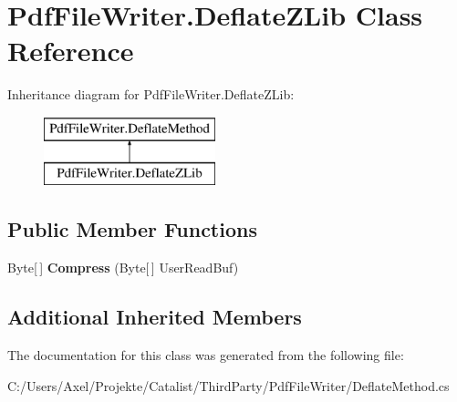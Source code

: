 \hypertarget{class_pdf_file_writer_1_1_deflate_z_lib}{}\section{Pdf\+File\+Writer.\+Deflate\+Z\+Lib Class Reference}
\label{class_pdf_file_writer_1_1_deflate_z_lib}
Inheritance diagram for Pdf\+File\+Writer.\+Deflate\+Z\+Lib\+:\begin{figure}[H]
\begin{center}
\leavevmode
\includegraphics[height=2.000000cm]{class_pdf_file_writer_1_1_deflate_z_lib}
\end{center}
\end{figure}
\subsection*{Public Member Functions}
\begin{DoxyCompactItemize}
\item 
Byte\mbox{[}$\,$\mbox{]} {\bfseries Compress} (Byte\mbox{[}$\,$\mbox{]} User\+Read\+Buf)\hypertarget{class_pdf_file_writer_1_1_deflate_z_lib_a4b374a36c658ae27af326a5a37908906}{}\label{class_pdf_file_writer_1_1_deflate_z_lib_a4b374a36c658ae27af326a5a37908906}

\end{DoxyCompactItemize}
\subsection*{Additional Inherited Members}


The documentation for this class was generated from the following file\+:\begin{DoxyCompactItemize}
\item 
C\+:/\+Users/\+Axel/\+Projekte/\+Catalist/\+Third\+Party/\+Pdf\+File\+Writer/Deflate\+Method.\+cs\end{DoxyCompactItemize}
